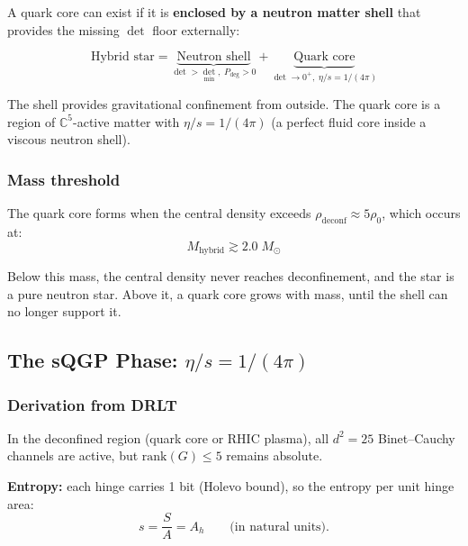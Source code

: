 \documentclass[12pt]{article}
\theoremstyle{remark}
\theoremstyle{definition}
\newcommand{\CC}{\mathbb{C}}
\begin{document}
A quark core can exist if it is \textbf{enclosed by a neutron matter shell} that provides the missing $\det$ floor externally:

\begin{equation}
\text{Hybrid star} = \underbrace{\text{Neutron shell}}_{\det > \det_\text{min},\; P_\text{deg} > 0} + \underbrace{\text{Quark core}}_{\det \to 0^+,\; \eta/s = 1/(4\pi)}
\end{equation}

The shell provides gravitational confinement from outside. The quark core is a region of $\CC^5$-active matter with $\eta/s = 1/(4\pi)$ (a perfect fluid core inside a viscous neutron shell).

\subsubsection{Mass threshold}

The quark core forms when the central density exceeds $\rho_\text{deconf} \approx 5\rho_0$, which occurs at:
\begin{equation}
M_\text{hybrid} \gtrsim 2.0\;M_\odot
\end{equation}

Below this mass, the central density never reaches deconfinement, and the star is a pure neutron star. Above it, a quark core grows with mass, until the shell can no longer support it.

\subsection{The sQGP Phase: $\eta/s = 1/(4\pi)$}

\subsubsection{Derivation from DRLT}

In the deconfined region (quark core or RHIC plasma), all $d^2 = 25$ Binet--Cauchy channels are active, but $\text{rank}(G) \leq 5$ remains absolute.

\textbf{Entropy:} each hinge carries 1 bit (Holevo bound), so the entropy per unit hinge area:
\begin{equation}
s = \frac{S}{A} = A_h \qquad \text{(in natural units)}.
\end{equation}
\end{document}
